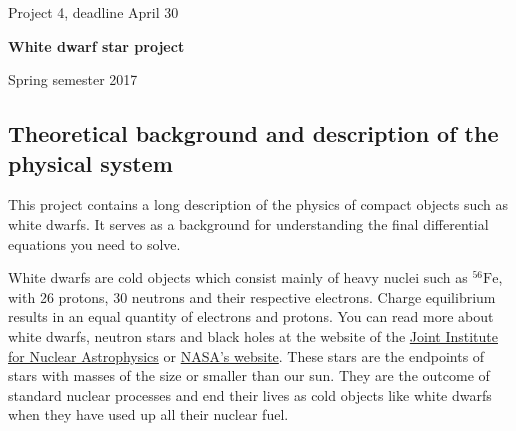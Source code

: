 \documentclass[%
oneside,                 %
final,                   %
10pt]{article}
\begin{document}

\newcommand{\exercisesection}[1]{\subsection*{#1}}






\thispagestyle{empty}

\begin{center}
{\LARGE\bf
\begin{spacing}{1.25}
Project 4, deadline  April 30
\end{spacing}
}
\end{center}


\begin{center}
{\bf White dwarf star  project${}^{}$} \\ [0mm]
\end{center}

\begin{center}
\end{center}
    

\begin{center}
Spring semester 2017
\end{center}

\vspace{1cm}


\subsection*{Theoretical background and description of the physical system}

This project contains a long description of the physics of compact objects such as white dwarfs.
It serves as a background for understanding the final differential equations you need to solve.

White dwarfs are cold objects which consist mainly of heavy nuclei such as $^{56}\mbox{Fe}$, with 26 protons, 30 neutrons
and  their respective electrons.  Charge equilibrium results in an equal quantity of electrons and protons.
You can read more about white dwarfs, neutron stars and black holes at the website of the
\href{{http://www.jinaweb.org}}{Joint Institute for Nuclear Astrophysics} or \href{{http://www.nasa.org}}{NASA's website}.
These stars are the endpoints of stars with masses of the size or smaller than our sun. 
They are the outcome of standard nuclear processes and end their lives as 
cold objects like white dwarfs when they have used up all their nuclear fuel.
\end{document}
